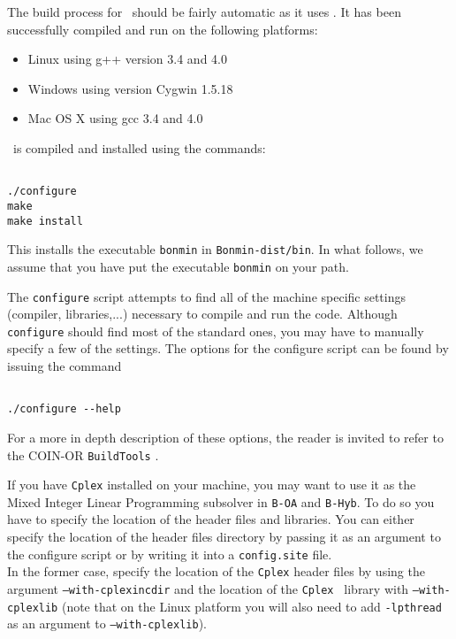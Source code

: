 The build process for \Bonmin\ should be fairly automatic as it uses
.
  It has been successfully compiled and run on the following platforms:
\begin{itemize}
\item Linux using g++ version 3.4 and 4.0
\item Windows using version Cygwin 1.5.18
\item Mac OS X using gcc 3.4 and 4.0
\end{itemize}
\Bonmin\ is compiled and installed using the commands:
\begin{verbatim}

./configure
make
make install

\end{verbatim}

This installs the executable {\tt bonmin} in {\tt Bonmin-dist/bin}. In what follows, we assume
that you have put the executable {\tt bonmin} on your path.

The {\tt configure} script attempts to find all of the machine specific settings (compiler, libraries,...)
necessary to compile and run the code. Although {\tt configure} should find most of the standard
ones, you may have to manually specify a few of the settings.
The options for the configure script can be found by issuing the command
\begin{verbatim}

./configure --help

\end{verbatim}
For a more in depth description of these options,
the reader is invited to refer to the COIN-OR {\tt BuildTools} .

If you have {\tt Cplex} installed on your machine, you may want to use it
as the Mixed Integer Linear Programming subsolver in {\tt B-OA} and {\tt B-Hyb}.
To do so you have to specify the location of the header files and libraries.
You can either specify the location of the header files directory by passing it as an
argument to the configure script or by writing it into a {\tt config.site} file.\\

In the former case, specify the location of the {\tt Cplex} header files by using the
argument {\tt --with-cplexincdir} and the location of the
{\tt Cplex } library with {\tt --with-cplexlib} (note that on the Linux platform you will also
need to add {\tt -lpthread} as an argument to {\tt --with-cplexlib}).\\

